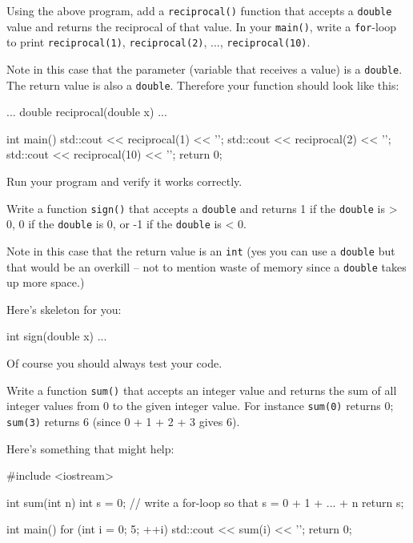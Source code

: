 \begin{ex}
Using the above program, add a \texttt{reciprocal()} function that accepts a \texttt{double} value and returns the reciprocal of that value. In your \texttt{main()}, write a \texttt{for}-loop to print \texttt{reciprocal(1)}, \texttt{reciprocal(2)}, ..., \texttt{reciprocal(10)}.

Note in this case that the parameter (variable that receives a value) is a \texttt{double}. The return value is also a \texttt{double}. Therefore your function should look like this:

\begin{consolethree}[escapeinside=||]
...
double reciprocal(double x)
{
    ...
}

int main()
{
    std::cout << reciprocal(1) << '\n';
    std::cout << reciprocal(2) << '\n';
    std::cout << reciprocal(10) << '\n';
    return 0;
}
\end{consolethree}

Run your program and verify it works correctly.
\end{ex}

\begin{ex}
Write a function \texttt{sign()} that accepts a \texttt{double} and returns 1 if the \texttt{double} is > 0, 0 if the \texttt{double} is 0, or -1 if the \texttt{double} is < 0.

Note in this case that the return value is an \texttt{int} (yes you can use a \texttt{double} but that would be an overkill -- not to mention waste of memory since a \texttt{double} takes up more space.)

Here's skeleton for you:

\begin{consolethree}[escapeinside=||]
int sign(double x)
{
    ...
}
\end{consolethree}

Of course you should always test your code.
\end{ex}

\begin{ex}
Write a function \texttt{sum()} that accepts an integer value and returns the sum of all integer values from 0 to the given integer value. For instance \texttt{sum(0)} returns 0; \texttt{sum(3)} returns 6 (since 0 + 1 + 2 + 3 gives 6).

Here's something that might help:

\begin{consolethree}[escapeinside=||]
#include <iostream>

int sum(int n)
{
    int s = 0;
    // write a for-loop so that s = 0 + 1 + ... + n
    return s;
}

int main()
{
    for (int i = 0; 5; ++i)
    {
        std::cout << sum(i) << '\n';
    }
    return 0;
}
\end{consolethree}
\end{ex}

